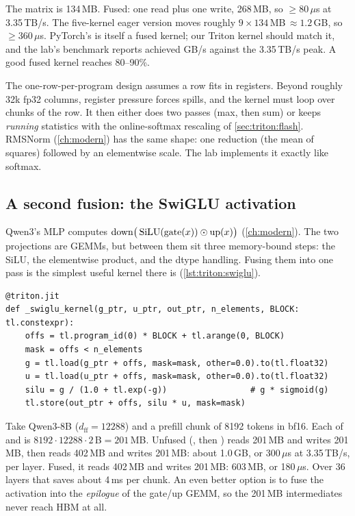 \begin{napkinmath}
The matrix is 134\,MB. Fused: one read plus one write, 268\,MB, so
$\ge 80\,\mu$s at 3.35\,TB/s. The five-kernel eager version moves roughly
$9\times134$\,MB\,$\approx1.2$\,GB, so $\ge360\,\mu$s. PyTorch's  is
itself a fused kernel; our Triton kernel should match it, and the lab's benchmark
reports achieved GB/s against the 3.35\,TB/s peak. A good fused kernel reaches 80--90\%.
\end{napkinmath}

The one-row-per-program design assumes a row fits in registers. Beyond roughly 32k
fp32 columns, register pressure forces spills, and the kernel must loop over chunks of
the row. It then either does two passes (max, then sum) or keeps \emph{running}
statistics with the online-softmax rescaling of \cref{sec:triton:flash}. RMSNorm
(\cref{ch:modern}) has the same shape: one reduction (the mean of squares) followed by
an elementwise scale. The lab implements it exactly like softmax.

\subsection{A second fusion: the SwiGLU activation}
Qwen3's MLP computes $\mathrm{down}\big(\operatorname{SiLU}(\mathrm{gate}(x))\odot\mathrm{up}(x)\big)$
(\cref{ch:modern}). The two projections are GEMMs, but between them sit three
memory-bound steps: the SiLU, the elementwise product, and the dtype handling. Fusing
them into one pass is the simplest useful kernel there is (\cref{lst:triton:swiglu}).

\begin{lstlisting}[caption={Fused SiLU-and-multiply (\ident{llmsys/kernels/triton_kernels.py}).},
label={lst:triton:swiglu}]
@triton.jit
def _swiglu_kernel(g_ptr, u_ptr, out_ptr, n_elements, BLOCK: tl.constexpr):
    offs = tl.program_id(0) * BLOCK + tl.arange(0, BLOCK)
    mask = offs < n_elements
    g = tl.load(g_ptr + offs, mask=mask, other=0.0).to(tl.float32)
    u = tl.load(u_ptr + offs, mask=mask, other=0.0).to(tl.float32)
    silu = g / (1.0 + tl.exp(-g))                 # g * sigmoid(g)
    tl.store(out_ptr + offs, silu * u, mask=mask)
\end{lstlisting}

\begin{napkinmath}
Take Qwen3-8B ($d_{\text{ff}}=12288$) and a prefill chunk of 8192 tokens in bf16. Each of
 and  is $8192\cdot12288\cdot2$\,B$=201$\,MB. Unfused (,
then ) reads 201\,MB and writes 201\,MB, then reads 402\,MB and writes
201\,MB: about 1.0\,GB, or 300\,$\mu$s at 3.35\,TB/s, per layer. Fused, it reads 402\,MB
and writes 201\,MB: 603\,MB, or 180\,$\mu$s. Over 36 layers that saves about 4\,ms per
chunk. An even better option is to fuse the activation into the \emph{epilogue} of the
gate/up GEMM, so the 201\,MB intermediates never reach HBM at all.
\end{napkinmath}

